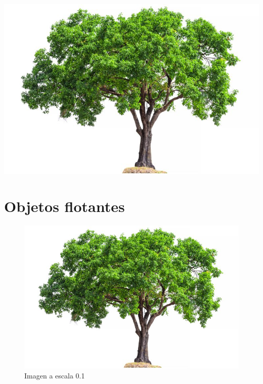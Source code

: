 \documentclass[12pt]{article}
\begin{document}
\begin{center}
\includegraphics[scale=.25]{figuras/tree.jpg}
\end{center}

\section{Objetos flotantes}


\begin{figure}[!hb]
\centering
\includegraphics[scale=0.1]{figuras/tree.jpg}
\caption{Imagen a escala 0.1}
\label{figura1}
\end{figure}
\end{document}
